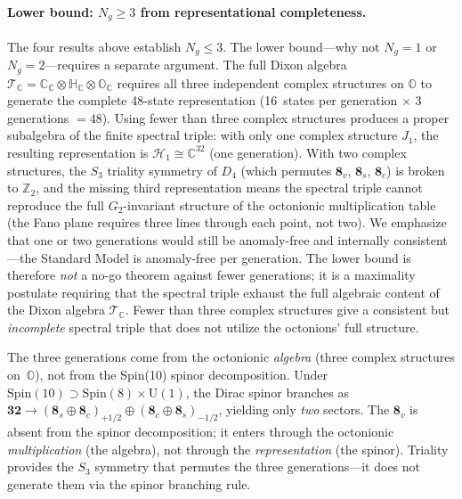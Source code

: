 \paragraph{Lower bound: $N_g \geq 3$ from representational completeness.}
The four results above establish $N_g \leq 3$. The lower bound---why not $N_g = 1$ or $N_g = 2$---requires a separate argument. The full Dixon algebra $\mathcal{T}_{\mathbb{C}} = \mathbb{C}_{\mathbb{C}} \otimes \mathbb{H}_{\mathbb{C}} \otimes \mathbb{O}_{\mathbb{C}}$ requires all three independent complex structures on $\mathbb{O}$ to generate the complete 48-state representation (16~states per generation $\times$ 3 generations $= 48$). Using fewer than three complex structures produces a proper subalgebra of the finite spectral triple: with only one complex structure $J_1$, the resulting representation is $\mathcal{H}_1 \cong \mathbb{C}^{32}$ (one generation). With two complex structures, the $S_3$ triality symmetry of $D_4$ (which permutes $\mathbf{8}_v$, $\mathbf{8}_s$, $\mathbf{8}_c$) is broken to $\mathbb{Z}_2$, and the missing third representation means the spectral triple cannot reproduce the full $G_2$-invariant structure of the octonionic multiplication table (the Fano plane requires three lines through each point, not two). We emphasize that one or two generations would still be anomaly-free and internally consistent---the Standard Model is anomaly-free per generation. The lower bound is therefore \emph{not} a no-go theorem against fewer generations; it is a maximality postulate requiring that the spectral triple exhaust the full algebraic content of the Dixon algebra $\mathcal{T}_{\mathbb{C}}$. Fewer than three complex structures give a consistent but \emph{incomplete} spectral triple that does not utilize the octonions' full structure.

\begin{remark}
The three generations come from the octonionic \emph{algebra} (three complex structures on~$\mathbb{O}$), not from the Spin(10) spinor decomposition. Under $\mathrm{Spin}(10) \supset \mathrm{Spin}(8) \times \mathrm{U}(1)$, the Dirac spinor branches as $\mathbf{32} \to (\mathbf{8}_s \oplus \mathbf{8}_c)_{+1/2} \oplus (\mathbf{8}_c \oplus \mathbf{8}_s)_{-1/2}$, yielding only \emph{two} sectors. The $\mathbf{8}_v$ is absent from the spinor decomposition; it enters through the octonionic \emph{multiplication} (the algebra), not through the \emph{representation} (the spinor). Triality provides the $S_3$ symmetry that permutes the three generations---it does not generate them via the spinor branching rule.
\end{remark}


